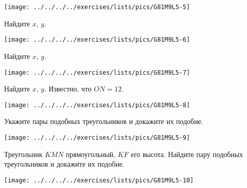 \begin{class}[number=4]
\begin{listofex}
		\hspace{0.02\linewidth}
		\begin{minipage}[t]{\picwidth}
			\texttt{[image: ../../../../exercises/lists/pics/G81M9L5-5]}
		\end{minipage}
		\item
		\begin{minipage}[t]{\bodywidth}
			Найдите \( x \), \( y \).
		\end{minipage}
		\hspace{0.02\linewidth}
		\begin{minipage}[t]{\picwidth}
			\texttt{[image: ../../../../exercises/lists/pics/G81M9L5-6]}
		\end{minipage}
		\item
		\begin{minipage}[t]{\bodywidth}
			Найдите \( x \), \( y \).
		\end{minipage}
		\hspace{0.02\linewidth}
		\begin{minipage}[t]{\picwidth}
			\texttt{[image: ../../../../exercises/lists/pics/G81M9L5-7]}
		\end{minipage}
		\item
		\begin{minipage}[t]{\bodywidth}
			Найдите \( x \), \( y \). Известно, что \( ON=12 \).
		\end{minipage}
		\hspace{0.02\linewidth}
		\begin{minipage}[t]{\picwidth}
			\texttt{[image: ../../../../exercises/lists/pics/G81M9L5-8]}
		\end{minipage}
		\item 
		\begin{minipage}[t]{\bodywidth}
			Укажите пары подобных треугольников и докажите их подобие.
		\end{minipage}
		\hspace{0.02\linewidth}
		\begin{minipage}[t]{\picwidth}
			\texttt{[image: ../../../../exercises/lists/pics/G81M9L5-9]}
		\end{minipage}
		\item 
		\begin{minipage}[t]{\bodywidth}
			Треугольник \( KMN \) прямоугольный, \( KF \) его высота. Найдите пару подобных треугольников и докажите их подобие.
		\end{minipage}
		\hspace{0.02\linewidth}
		\begin{minipage}[t]{\picwidth}
			\texttt{[image: ../../../../exercises/lists/pics/G81M9L5-10]}
			

\end{minipage}
\end{listofex}
\end{class}
